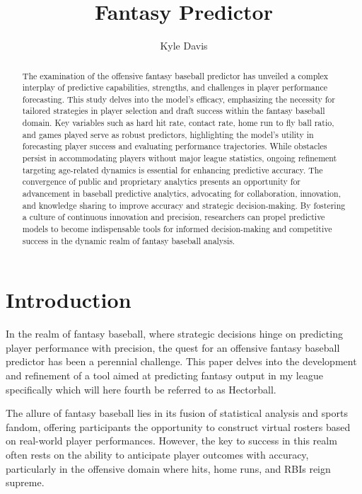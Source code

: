 \documentclass[12pt, english]{article}
\title{Fantasy Predictor}
\author{Kyle Davis}
\begin{document}
\maketitle

\begin{abstract}
The examination of the offensive fantasy baseball predictor has unveiled a complex interplay of predictive capabilities, strengths, and challenges in player performance forecasting. This study delves into the model's efficacy, emphasizing the necessity for tailored strategies in player selection and draft success within the fantasy baseball domain. Key variables such as hard hit rate, contact rate, home run to fly ball ratio, and games played serve as robust predictors, highlighting the model's utility in forecasting player success and evaluating performance trajectories. While obstacles persist in accommodating players without major league statistics, ongoing refinement targeting age-related dynamics is essential for enhancing predictive accuracy. The convergence of public and proprietary analytics presents an opportunity for advancement in baseball predictive analytics, advocating for collaboration, innovation, and knowledge sharing to improve accuracy and strategic decision-making. By fostering a culture of continuous innovation and precision, researchers can propel predictive models to become indispensable tools for informed decision-making and competitive success in the dynamic realm of fantasy baseball analysis.
\end{abstract}
\vfill{}


\pagebreak{}

\section{Introduction}

In the realm of fantasy baseball, where strategic decisions hinge on predicting player performance with precision, the quest for an offensive fantasy baseball predictor has been a perennial challenge. This paper delves into the development and refinement of a tool aimed at predicting fantasy output in my league specifically which will here fourth be referred to as Hectorball.

The allure of fantasy baseball lies in its fusion of statistical analysis and sports fandom, offering participants the opportunity to construct virtual rosters based on real-world player performances. However, the key to success in this realm often rests on the ability to anticipate player outcomes with accuracy, particularly in the offensive domain where hits, home runs, and RBIs reign supreme.
\end{document}
